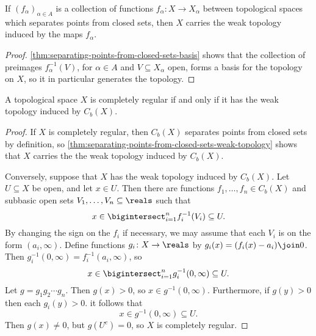 \documentclass[article, a4paper, 11pt, oneside]{memoir}
\numberwithin{equation}{chapter}
\newcommand{\preim}{^{-1}}
\begin{document}
\begin{corollary}
    \label{thm:separating-points-from-closed-sets-weak-topology}
    If $(f_\alpha)_{\alpha \in A}$ is a collection of functions $f_\alpha \colon X \to X_\alpha$ between topological spaces which separates points from closed sets, then $X$ carries the weak topology induced by the maps $f_\alpha$.
\end{corollary}

\begin{proof}
    \cref{thm:separating-points-from-closed-sets-basis} shows that the collection of preimages $f_\alpha\preim(V)$, for $\alpha \in A$ and $V \subseteq X_\alpha$ open, forms a basis for the topology on $X$, so it in particular generates the topology.
\end{proof}



\begin{theorem}
    A topological space $X$ is completely regular if and only if it has the weak topology induced by $C_b(X)$.
\end{theorem}

\begin{proof}
    If $X$ is completely regular, then $C_b(X)$ separates points from closed sets by definition, so \cref{thm:separating-points-from-closed-sets-weak-topology} shows that $X$ carries the the weak topology induced by $C_b(X)$.

    Conversely, suppose that $X$ has the weak topology induced by $C_b(X)$. Let $U \subseteq X$ be open, and let $x \in U$. Then there are functions $f_1, \ldots, f_n \in C_b(X)$ and subbasic open sets $V_1, \ldots, V_n \subseteq \reals$ such that
    \begin{equation*}
        x
            \in \bigintersect_{i=1}^n f_i\preim(V_i)
            \subseteq U.
    \end{equation*}
    By changing the sign on the $f_i$ if necessary, we may assume that each $V_i$ is on the form $(a_i, \infty)$. Define functions $g_i \colon X \to \reals$ by $g_i(x) = (f_i(x) - a_i) \join 0$. Then $g_i\preim(0,\infty) = f_i\preim(a_i,\infty)$, so
    \begin{equation*}
        x
            \in \bigintersect_{i=1}^n g_i\preim(0,\infty)
            \subseteq U.
    \end{equation*}
    Let $g = g_1 g_2 \cdots g_n$. Then $g(x) > 0$, so $x \in g\preim(0,\infty)$. Furthermore, if $g(y) > 0$ then each $g_i(y) > 0$. it follows that
    \begin{equation*}
        x
            \in g\preim(0,\infty)
            \subseteq U.
    \end{equation*}
    Then $g(x) \neq 0$, but $g(U^c) = 0$, so $X$ is completely regular.
\end{proof}
\end{document}
